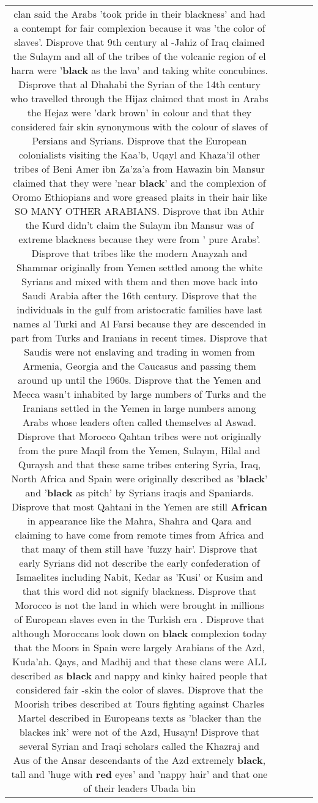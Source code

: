 \documentclass[11pt]{article}
\newlength\mylength
\begin{document}
\begin{center}
\begin{longtable}{|C{.65\mylength}|C{.30\mylength}|C{.12\mylength}|C{.12\mylength}|C{.12\mylength}|}
clan said the Arabs 'took pride in their blackness' and had a contempt for fair complexion because it was 'the color of slaves'. Disprove that 9th century al -Jahiz of Iraq claimed the Sulaym and all of the tribes of the volcanic region of el harra were '\textbf{black} as the lava' and taking white concubines. Disprove that al Dhahabi the Syrian of the 14th century who travelled through the Hijaz claimed that most in Arabs the Hejaz were 'dark brown' in colour and that they considered fair skin synonymous with the colour of slaves of Persians and Syrians. Disprove that the European colonialists visiting the Kaa'b, Uqayl and Khaza'il other tribes of Beni Amer ibn Za'za'a from Hawazin bin Mansur claimed that they were 'near \textbf{black}' and the complexion of Oromo Ethiopians and wore greased plaits in their hair like SO MANY OTHER ARABIANS. Disprove that ibn Athir the Kurd didn't claim the Sulaym ibn Mansur was of extreme blackness because they were from ' pure Arabs'. Disprove that tribes like the modern Anayzah and Shammar originally from Yemen settled among the white Syrians and mixed with them and then move back into Saudi Arabia after the 16th century. Disprove that the individuals in the gulf from aristocratic families have last names al Turki and Al Farsi because they are descended in part from Turks and Iranians in recent times. Disprove that Saudis were not enslaving and trading in women from Armenia, Georgia and the Caucasus and passing them around up until the 1960s. Disprove that the Yemen and Mecca wasn't inhabited by large numbers of Turks and the Iranians settled in the Yemen in large numbers among Arabs whose leaders often called themselves al Aswad. Disprove that Morocco Qahtan tribes were not originally from the pure Maqil from the Yemen, Sulaym, Hilal and Quraysh and that these same tribes entering Syria, Iraq, North Africa and Spain were originally described as '\textbf{black}' and '\textbf{black} as pitch' by Syrians iraqis and Spaniards. Disprove that most Qahtani in the Yemen are still \textbf{African} in appearance like the Mahra, Shahra and Qara and claiming to have come from remote times from Africa and that many of them still have 'fuzzy hair'. Disprove that early Syrians did not describe the early confederation of Ismaelites including Nabit, Kedar as 'Kusi' or Kusim and that this word did not signify blackness. Disprove that Morocco is not the land in which were brought in millions of European slaves even in the Turkish era . Disprove that although Moroccans look down on \textbf{black} complexion today that the Moors in Spain were largely Arabians of the Azd, Kuda'ah. Qays, and Madhij and that these clans were ALL described as \textbf{black} and nappy and kinky haired people that considered fair -skin the color of slaves. Disprove that the Moorish tribes described at Tours fighting against Charles Martel described in Europeans texts as 'blacker than the blackes ink' were not of the Azd, Husayn! Disprove that several Syrian and Iraqi scholars called the Khazraj and Aus of the Ansar descendants of the Azd extremely \textbf{black}, tall and 'huge with \textbf{r\textbf{ed}} eyes' and 'nappy hair' and that one of their leaders Ubada bin 
\end{longtable}
\end{center}
\end{document}
